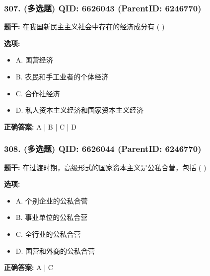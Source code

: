 \documentclass[12pt,UTF8]{ctexart}
\begin{document}
\subsubsection*{307. (多选题) \small QID: 6626043 (ParentID: 6246770)}

\textbf{题干:}
在我国新民主主义社会中存在的经济成分有  ( )



\textbf{选项:}
\begin{itemize}[leftmargin=*]

  \item A. 国营经济

  \item B. 农民和手工业者的个体经济

  \item C. 合作社经济

  \item D. 私人资本主义经济和国家资本主义经济

\end{itemize}

\textbf{正确答案:}
A | B | C | D

\vspace{0.3em}\hrulefill\vspace{0.7em}

\subsubsection*{308. (多选题) \small QID: 6626044 (ParentID: 6246770)}

\textbf{题干:}
在过渡时期，高级形式的国家资本主义是公私合营，包括  ( )



\textbf{选项:}
\begin{itemize}[leftmargin=*]

  \item A. 个别企业的公私合营

  \item B. 事业单位的公私合营

  \item C. 全行业的公私合营

  \item D. 国营和外商的公私合营

\end{itemize}

\textbf{正确答案:}
A | C

\vspace{0.3em}\hrulefill\vspace{0.7em}
\end{document}
